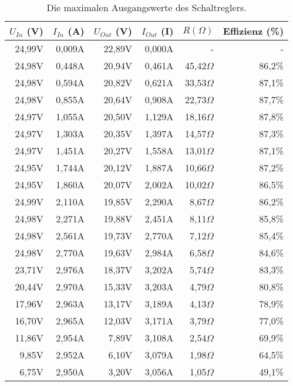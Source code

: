 \begin{table}[h]
\centering
\begin{tabular}{|r|r|r|r|r|r|}
\hline
$U_{In}$ (V) & $I_{In}$ (A) & $U_{Out}$ (V) & $I_{Out}$ (I) & $R \left(\Omega\right)$ & Effizienz (\%) \\ \hline
24,99V   & 0,009A   & 22,89V    & 0,000A        & -                & -         \\ \hline
24,98V   & 0,448A   & 20,94V    & 0,461A    & 45,42$\Omega$            & 86,2\%    \\ \hline
24,98V   & 0,594A   & 20,82V    & 0,621A    & 33,53$\Omega$            & 87,1\%    \\ \hline
24,98V   & 0,855A   & 20,64V    & 0,908A    & 22,73$\Omega$            & 87,7\%    \\ \hline
24,97V   & 1,055A   & 20,50V     & 1,129A    & 18,16$\Omega$            & 87,8\%    \\ \hline
24,97V   & 1,303A   & 20,35V    & 1,397A    & 14,57$\Omega$            & 87,3\%    \\ \hline
24,97V   & 1,451A   & 20,27V    & 1,558A    & 13,01$\Omega$            & 87,1\%    \\ \hline
24,95V   & 1,744A   & 20,12V    & 1,887A    & 10,66$\Omega$            & 87,2\%    \\ \hline
24,95V   & 1,860A    & 20,07V    & 2,002A    & 10,02$\Omega$            & 86,5\%    \\ \hline
24,99V   & 2,110A    & 19,85V    & 2,290A     & 8,67$\Omega$             & 86,2\%    \\ \hline
24,98V   & 2,271A   & 19,88V    & 2,451A    & 8,11$\Omega$             & 85,8\%    \\ \hline
24,98V   & 2,561A   & 19,73V    & 2,770A     & 7,12$\Omega$             & 85,4\%    \\ \hline
24,98V   & 2,770A    & 19,63V    & 2,984A    & 6,58$\Omega$             & 84,6\%    \\ \hline
23,71V   & 2,976A   & 18,37V    & 3,202A    & 5,74$\Omega$             & 83,3\%    \\ \hline
20,44V   & 2,970A    & 15,33V    & 3,203A    & 4,79$\Omega$             & 80,8\%    \\ \hline
17,96V   & 2,963A   & 13,17V    & 3,189A    & 4,13$\Omega$             & 78,9\%    \\ \hline
16,70V   & 2,965A   & 12,03V    & 3,171A    & 3,79$\Omega$             & 77,0\%    \\ \hline
11,86V   & 2,954A   & 7,89V     & 3,108A    & 2,54$\Omega$             & 69,9\%    \\ \hline
9,85V    & 2,952A   & 6,10V      & 3,079A    & 1,98$\Omega$             & 64,5\%    \\ \hline
6,75V    & 2,950A    & 3,20V      & 3,056A    & 1,05$\Omega$             & 49,1\%    \\ \hline
\end{tabular}
\caption{Die maximalen Ausgangswerte des Schaltreglers.}
\label{tab_maxregler}
\end{table}

